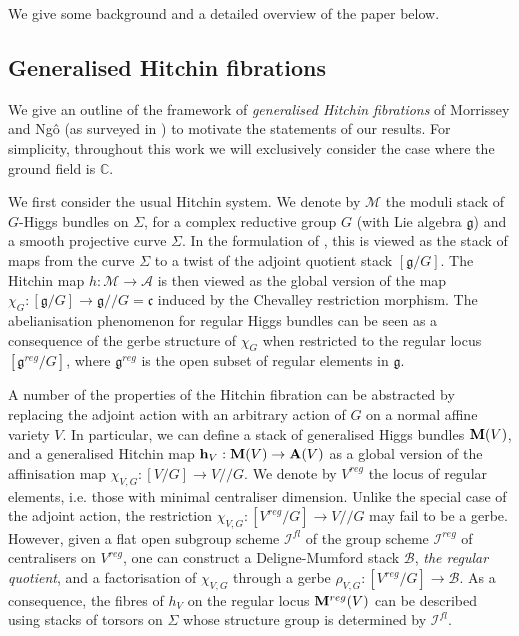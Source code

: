 \documentclass{amsart}
\theoremstyle{remark}
\numberwithin{theorem}{section}
\numberwithin{equation}{section}
\begin{document}
We give some background and a detailed overview of the paper below.


\subsection*{Generalised Hitchin fibrations} 

We give an outline of the framework of \emph{generalised Hitchin fibrations} of Morrissey and Ngô (as surveyed in \cite{Ngo3}) to motivate the statements of our results. For simplicity, throughout this work we will exclusively consider the case where the ground field is $\mathbb{C}$.

We first consider the usual Hitchin system. We denote by $\mathcal M$ the moduli stack of $G$-Higgs bundles on $\Sigma$, for a complex reductive group $G$ (with Lie algebra $\mathfrak{g}$) and a smooth projective curve $\Sigma$. In the formulation of \cite{Ngo1}, this is viewed as the stack of maps from the curve $\Sigma$ to a twist of the adjoint quotient stack $[\mathfrak{g}/G]$. The Hitchin map $h:\mathcal M \rightarrow \mathcal A$ is then viewed as the global version of the map $\chi_G:[\mathfrak{g}/G] \rightarrow \mathfrak{g}//G = \mathfrak{c}$ induced by the Chevalley restriction morphism. The abelianisation phenomenon for regular Higgs bundles can be seen as a consequence of the gerbe structure of $\chi_G$ when restricted to the regular locus $[\mathfrak{g}^{reg}/G]$, where $\mathfrak{g}^{reg}$ is the open subset of regular elements in $\mathfrak{g}$.

A number of the properties of the Hitchin fibration can be abstracted by replacing the adjoint action with an arbitrary action of $G$ on a normal affine variety $V$. In particular, we can define a stack of generalised Higgs bundles ${\bf M}(V)$, and a generalised Hitchin map ${\bf h}_V: {\bf M}(V) \rightarrow {\bf A}(V)$ as a global version of the affinisation map $\chi_{V,G}:[V/G] \rightarrow V//G$. We denote by $V^{reg}$ the locus of regular elements, i.e. those with minimal centraliser dimension. Unlike the special case of the adjoint action, the restriction $\chi_{V,G}:[V^{reg}/G] \rightarrow V//G$ may fail to be a gerbe. However, given a flat open subgroup scheme $\mathcal I^{fl}$ of the group scheme $\mathcal I^{reg}$ of centralisers on $V^{reg}$, one can construct a Deligne-Mumford stack $\mathcal B$, \emph{the regular quotient}, and a factorisation of $\chi_{V,G}$ through a gerbe $\rho_{V,G}:[V^{reg}/G] \rightarrow \mathcal B$. As a consequence, the fibres of $h_V$ on the regular locus $ {\bf M}^{reg}(V)$ can be described using stacks of torsors on $\Sigma$ whose structure group is determined by $\mathcal I^{fl}$.
\end{document}
